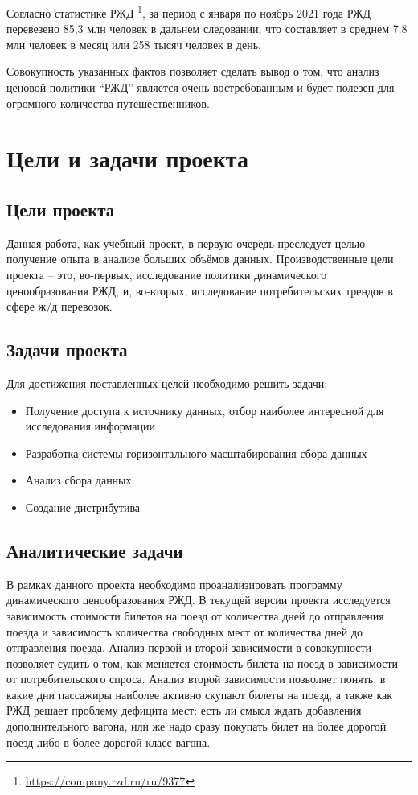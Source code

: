 \documentclass[conference]{IEEEtran}
\begin{document}
Согласно статистике РЖД \footnote{\href{https://company.rzd.ru/ru/9377}{https://company.rzd.ru/ru/9377}}, за период с января по ноябрь 2021 года РЖД перевезено 85,3 млн человек в дальнем следовании, что составляет в среднем 7.8 млн человек в месяц или 258 тысяч человек в день.

Совокупность указанных фактов позволяет сделать вывод о том, что анализ ценовой политики ``РЖД'' является очень востребованным и будет полезен для огромного количества путешественников.

\section{Цели и задачи проекта}

\subsection{Цели проекта}
Данная работа, как учебный проект, в первую очередь преследует целью получение опыта в анализе больших объёмов данных. Производственные цели проекта -- это, во-первых, исследование политики динамического ценообразования РЖД, и, во-вторых, исследование потребительских трендов в сфере ж/д перевозок.

\subsection{Задачи проекта}

Для достижения поставленных целей необходимо решить задачи:
\begin{itemize}
	\item Получение доступа к источнику данных, отбор наиболее интересной для исследования информации
	\item Разработка системы горизонтального масштабирования сбора данных
	\item Анализ сбора данных
	\item Создание дистрибутива
\end{itemize} 

\subsection{Аналитические задачи}

В рамках данного проекта необходимо проанализировать программу динамического ценообразования РЖД. В текущей версии проекта исследуется зависимость стоимости билетов на поезд от количества дней до отправления поезда и зависимость количества свободных мест от количества дней до отправления поезда. Анализ первой и второй зависимости в совокупности позволяет судить о том, как меняется стоимость билета на поезд в зависимости от потребительского спроса. Анализ второй зависимости позволяет понять, в какие дни пассажиры наиболее активно скупают билеты на поезд, а также как РЖД решает проблему дефицита мест: есть ли смысл ждать добавления дополнительного вагона, или же надо сразу покупать билет на более дорогой поезд либо в более дорогой класс вагона.
\end{document}
